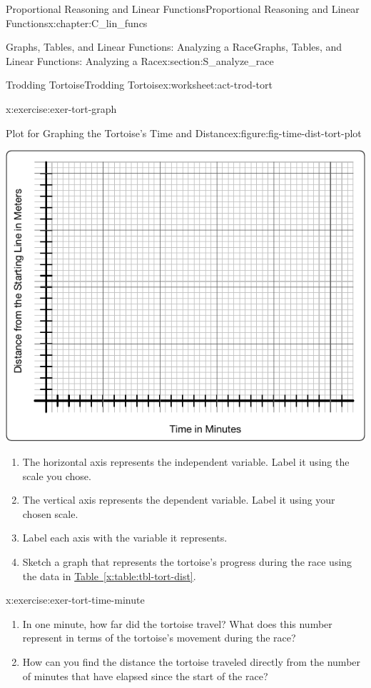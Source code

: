 \documentclass[oneside,10pt,]{book}
\newcommand{\xreffont}{\relax}
\numberwithin{equation}{chapter}
\begin{document}
\begin{chapterptx}{Proportional Reasoning and Linear Functions}{}{Proportional Reasoning and Linear Functions}{}{}{x:chapter:C_lin_funcs}
\begin{sectionptx}{Graphs, Tables, and Linear Functions: Analyzing a Race}{}{Graphs, Tables, and Linear Functions: Analyzing a Race}{}{}{x:section:S_analyze_race}
\begin{worksheet-subsection}{Trodding Tortoise}{}{Trodding Tortoise}{}{}{x:worksheet:act-trod-tort}
\begin{divisionexercise}{2}{}{}{x:exercise:exer-tort-graph}
\begin{figureptx}{Plot for Graphing the Tortoise's Time and Distance}{x:figure:fig-time-dist-tort-plot}{}
\begin{image}{0.1}{0.8}{0.1}
\includegraphics[width=\linewidth]{external/time-dist-tort-plot.pdf}
\end{image}%
\tcblower
\end{figureptx}%
\begin{enumerate}[font=\bfseries,label=(\alph*),ref=\alph*]
\item{}The horizontal axis represents the independent variable. Label it using the scale you chose.%
\item{}The vertical axis represents the dependent variable. Label it using your chosen scale.%
\item{}Label each axis with the variable it represents.%
\item{}Sketch a graph that represents the tortoise's progress during the race using the data in \hyperref[x:table:tbl-tort-dist]{Table~{\xreffont\ref{x:table:tbl-tort-dist}}}.%
\end{enumerate}
\end{divisionexercise}%
\begin{divisionexercise}{3}{}{}{x:exercise:exer-tort-time-minute}%
\begin{enumerate}[font=\bfseries,label=(\alph*),ref=\alph*]
\item{}In one minute, how far did the tortoise travel? What does this number represent in terms of the tortoise's movement during the race?%
\item{}How can you find the distance the tortoise traveled directly from the number of minutes that have elapsed since the start of the race?%

\end{enumerate}
\end{divisionexercise}
\end{worksheet-subsection}
\end{sectionptx}
\end{chapterptx}
\end{document}
